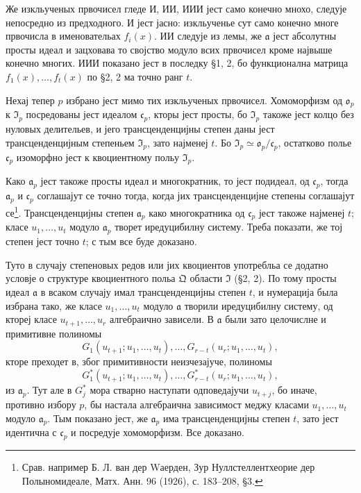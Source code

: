 \documentclass[11pt]{article}
\begin{document}
Же изкльученых првочисел гледе И, ИИ, ИИИ јест само конечно мнохо, следује непосредно из предходного. И јест јасно: изкльученье сут само конечно многе првочисла в именовательах \(f_i(x)\). ИИ следује из лемы, же \(\mathfrak{a}\) јест абсолутны просты идеал и зацховава то својство модуло всих првочисел кроме највыше конечно многих. ИИИ показано јест в последку §1, 2, бо функционална матрица \(f_1(x),\ldots,f_t(x)\) по §2, 2 ма точно ранг \(t\).

Нехај тепер \(p\) избрано јест мимо тих изкльученых првочисел. Хомоморфизм од \(\mathfrak{o}_p\) к \(\mathfrak{I}_p\) посредованы јест идеалом \(\mathfrak{c}_p\), кторы јест просты, бо \(\mathfrak{I}_p\) такоже јест колцо без нуловых делительев, и јего трансценденцијны степен даны јест трансценденцијным степеньем \(\mathfrak{I}_p\), зато најменеј \(t\). Бо \(\mathfrak{I}_p\simeq\mathfrak{o}_p/\mathfrak{c}_p\), остатково полье \(\mathfrak{c}_p\) изоморфно јест к квоциентному польу \(\mathfrak{I}_p\).

Како \(\mathfrak{a}_p\) јест такоже просты идеал и многократник, то јест подидеал, од \(\mathfrak{c}_p\), тогда \(\mathfrak{a}_p\) и \(\mathfrak{c}_p\) соглашајут се точно тогда, когда јих трансценденцијне степены соглашајут се\footnote{Срав. например Б. Л. ван дер Wаерден, Зур Нуллстеллентхеорие дер Полыномидеале, Матх. Анн. 96 (1926), с. 183--208, §3.}. Трансценденцијны степен \(\mathfrak{a}_p\) како многократника од \(\mathfrak{c}_p\) јест такоже најменеј \(t\); класе \(u_1,\ldots,u_t\) модуло \(\mathfrak{a}_p\) творет иредуцибилну систему. Треба показати, же тој степен јест точно \(t\); с тым все буде доказано.

Туто в случају степеновых редов или јих квоциентов употребльа се додатно условје о структуре квоциентного польа \(\mathfrak{Q}\) области \(\mathfrak{I}\) (§2, 2). По тому просты идеал \(\mathfrak{a}\) в всаком случају имал трансценденцијны степен \(t\), и нумерација была избрана тако, же класе \(u_1,\ldots,u_t\) модуло \(\mathfrak{a}\) творили иредуцибилну систему, од ктореј класе \(u_{t+1},\ldots,u_r\) алгебраично зависели. В \(\mathfrak{a}\) были зато целочислне и примитивне полиномы
\[
G_1(u_{t+1};u_1,\ldots,u_t),\ldots,G_{r-t}(u_r;u_1,\ldots,u_t),\tag{1}
\]
кторе преходет в, због примитивности неизчезајуче, полиномы
\[
G^*_1(u_{t+1};u_1,\ldots,u_t),\ldots,G^*_{r-t}(u_r;u_1,\ldots,u_t),\tag{2}
\]
из \(\mathfrak{a}_p\). Тут але в \(G^*_j\) мора стварно наступати одповедајучи \(u_{t+j}\), бо иначе, противно избору \(p\), бы настала алгебраична зависимост меджу класами \(u_1,\ldots,u_t\) модуло \(\mathfrak{a}_p\). Тым показано јест, же \(\mathfrak{a}_p\) има трансценденцијны степен \(t\), зато јест идентична с \(\mathfrak{c}_p\) и посредује хомоморфизм. Все доказано.
\end{document}
